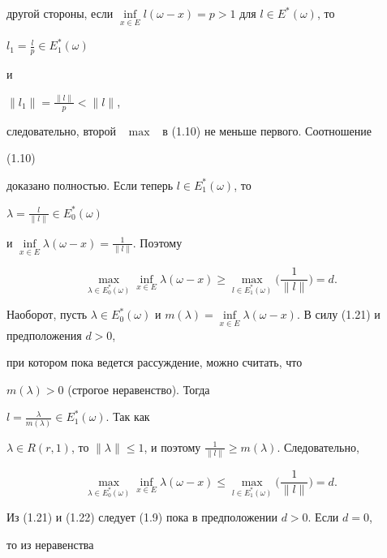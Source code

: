 \begin{pf}
другой стороны, если  $\inf\limits_{x\in 


E}l(\omega-x)=p>1$ для $l\in E^*(\omega)$, то 


$l_1=\frac{l}{p}\in E^*_1(\omega)$ 


и 


$\|l_1\|=\frac{\|l\|}{p}<\|l\|$, 


следовательно, второй \ $\max$ \ в (1.10) не меньше первого. Соотношение 


(1.10) 


доказано полностью. Если теперь $l\in E^*_1(\omega)$, то 


$\lambda=\frac{l}{\|l\|}\in E^*_0(\omega)$ 


и $\inf\limits_{x\in E}\lambda(\omega-x)=\frac{1}{\|l\|}$. Поэтому


\begin{equation} 


\max_{\lambda\in E^*_0(\omega)}\inf_{x\in E} 


\lambda(\omega-x)\ge\max_{l\in E^*_1(\omega)} 


\bigg(\frac{1}{\|l\|} \bigg)=d. 


\end{equation} 


Наоборот, пусть $\lambda\in E^*_0(\omega)$ и $m(\lambda)=\inf\limits_{x\in 


E}\lambda(\omega-x)$. В силу (1.21) и предположения $d>0$, 


при котором пока ведется рассуждение, можно считать, что 


$m(\lambda)>0$ (строгое неравенство). Тогда 


$l=\frac{\lambda}{m(\lambda)}\in E^*_1(\omega)$. Так как 


$\lambda\in R(r,1)$, то $\|\lambda\|\le1$, и поэтому $\frac{1}{\|l\|}\ge 


m(\lambda)$. Следовательно, 


\begin{equation} 


\max_{\lambda\in E^*_0(\omega)} 


\inf_{x\in E}\lambda(\omega-x)\le 


\max_{l\in E^*_1(\omega)}\bigg(\frac{1}{\|l\|} \bigg)=d. 


\end{equation} 


Из (1.21) и (1.22) следует (1.9) пока в предположении $d>0$. Если $d=0$, 


то из неравенства 



\end{pf}
